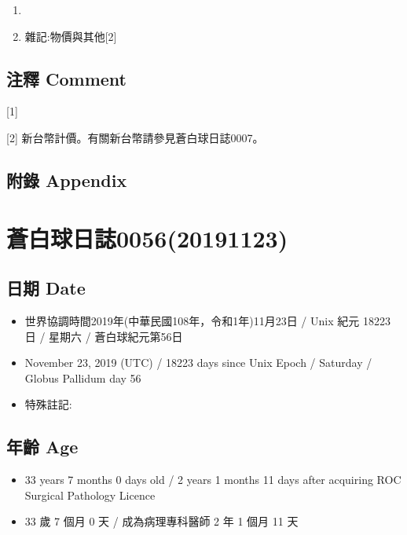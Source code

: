 \documentclass[a5paper, 12pt
]{book}
\providecommand{\tightlist}{%
  \setlength{\itemsep}{0pt}\setlength{\parskip}{0pt}}
\begin{document}
\begin{enumerate}
\def\labelenumi{\arabic{enumi}.}
\item
\item
  雜記:物價與其他{[}2{]}
\end{enumerate}

\hypertarget{ux6ce8ux91cb-comment-48}{%
\subsection{注釋 Comment}\label{ux6ce8ux91cb-comment-48}}

{[}1{]}

{[}2{]} 新台幣計價。有關新台幣請參見蒼白球日誌0007。

\hypertarget{ux9644ux9304-appendix-47}{%
\subsection{附錄 Appendix}\label{ux9644ux9304-appendix-47}}

\hypertarget{ux84bcux767dux7403ux65e5ux8a8c005620191123}{%
\section{蒼白球日誌0056(20191123)}\label{ux84bcux767dux7403ux65e5ux8a8c005620191123}}

\hypertarget{ux65e5ux671f-date-55}{%
\subsection{日期 Date}\label{ux65e5ux671f-date-55}}

\begin{itemize}
\tightlist
\item
  世界協調時間2019年(中華民國108年，令和1年)11月23日 / Unix 紀元 18223
  日 / 星期六 / 蒼白球紀元第56日
\item
  November 23, 2019 (UTC) / 18223 days since Unix Epoch / Saturday /
  Globus Pallidum day 56
\item
  特殊註記:
\end{itemize}

\hypertarget{ux5e74ux9f61-age-55}{%
\subsection{年齡 Age}\label{ux5e74ux9f61-age-55}}

\begin{itemize}
\tightlist
\item
  33 years 7 months 0 days old / 2 years 1 months 11 days after
  acquiring ROC Surgical Pathology Licence
\item
  33 歲 7 個月 0 天 / 成為病理專科醫師 2 年 1 個月 11 天
\end{itemize}
\end{document}

